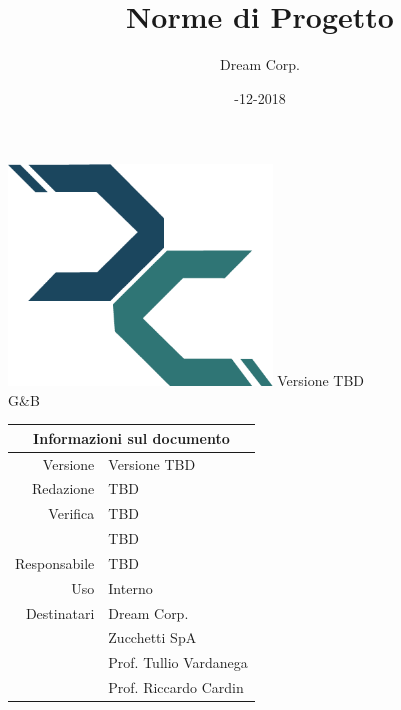 \documentclass[12pt]{article}
\title{\myfont Norme di Progetto}
\author{Dream Corp.}
\date{\myfont 04-12-2018}
\newcommand{\red}{TBD}
\newcommand{\verp}{TBD}
\newcommand{\vers}{TBD}
\newcommand{\res}{TBD}
\newcommand{\version}{Versione TBD}
\newcommand{\use}{Interno}
\begin{document}
	\maketitle
	\begin{center}
		\includegraphics[width = 70mm]{../../logo.png}\newline
		\huge \version 
		\\G\&B
		
		\begin{table}[h!]
			\centering
			\begin{tabular}{r|l}
				\multicolumn{2}{c}{Informazioni sul documento}\\
				\hline
				Versione & \version \\
				Redazione & \red \\
				Verifica & \verp\\
				& \vers\\
				Responsabile & \res\\
				Uso & \use\\
				Destinatari & Dream Corp. \\
				& Zucchetti SpA\\
				& Prof. Tullio Vardanega\\
				& Prof. Riccardo Cardin\\
			\end{tabular}
		\end{table}
		
	\end{center}
	\newpage
	
	\clearpage
	\newpage
	\tableofcontents
	\newpage

	
	\newpage

	
	\newpage
	
\newpage

\newpage

\end{document}
